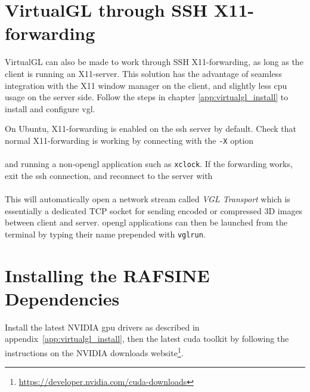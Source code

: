 \section{VirtualGL through SSH X11-forwarding}
VirtualGL can also be made to work through SSH X11-forwarding, as long as the client is running an X11-server. This solution has the advantage of seamless integration with the X11 window manager on the client, and slightly less \gls{cpu} usage on the server side. Follow the steps in chapter \ref{app:virtualgl_install} to install and configure \gls{vgl}.

On Ubuntu, X11-forwarding is enabled on the \gls{ssh} server by default. Check that normal X11-forwarding is working by connecting with the \texttt{-X} option\\[\baselineskip]
\\[\baselineskip]
and running a non-\gls{opengl} application such as \texttt{xclock}. If the forwarding works, exit the \gls{ssh} connection, and reconnect to the server with\\[\baselineskip]
\\[\baselineskip]
This will automatically open a network stream called \textit{VGL Transport} which is essentially a dedicated TCP socket for sending encoded or compressed 3D images between client and server. \gls{opengl} applications can then be launched from the terminal by typing their name prepended with \texttt{vglrun}.
\clearpage
\section{Installing the RAFSINE Dependencies}\label{app:rafsine_deps}
Install the latest NVIDIA \gls{gpu} drivers as described in appendix~\ref{app:virtualgl_install}, then the latest \gls{cuda} toolkit by following the instructions on the NVIDIA downloads website\footnote{\url{https://developer.nvidia.com/cuda-downloads}}.

